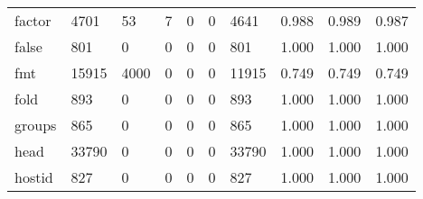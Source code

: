 \begin{longtable}{lp{2.0cm}p{2.0cm}p{2.0cm}p{2.0cm}p{2.0cm}p{2.0cm}p{2.0cm}p{2.0cm}p{2.0cm}}
factor    &                   4701 &                                 53 &                                 7 &                                0 &                                 0 &                            4641 &                                   0.988 &                                  0.989 &                                0.987 \\
false     &                    801 &                                  0 &                                 0 &                                0 &                                 0 &                             801 &                                   1.000 &                                  1.000 &                                1.000 \\
fmt       &                  15915 &                               4000 &                                 0 &                                0 &                                 0 &                           11915 &                                   0.749 &                                  0.749 &                                0.749 \\
fold      &                    893 &                                  0 &                                 0 &                                0 &                                 0 &                             893 &                                   1.000 &                                  1.000 &                                1.000 \\
groups    &                    865 &                                  0 &                                 0 &                                0 &                                 0 &                             865 &                                   1.000 &                                  1.000 &                                1.000 \\
head      &                  33790 &                                  0 &                                 0 &                                0 &                                 0 &                           33790 &                                   1.000 &                                  1.000 &                                1.000 \\
hostid    &                    827 &                                  0 &                                 0 &                                0 &                                 0 &                             827 &                                   1.000 &                                  1.000 &                                1.000 \\

\end{longtable}
